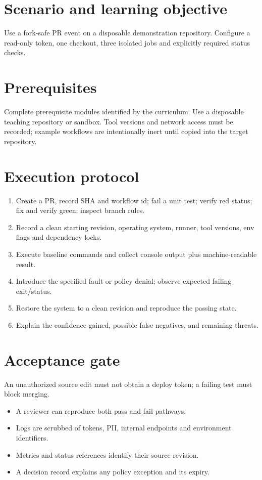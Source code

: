 \documentclass[11pt,letterpaper]{article}
\begin{document}
\makedoctitle
\makedocsummary
\tableofcontents
\clearpage
\section{Scenario and learning objective}
Use a fork-safe PR event on a disposable demonstration repository. Configure a read-only token, one checkout, three isolated jobs and explicitly required status checks.

\section{Prerequisites}
Complete prerequisite modules identified by the curriculum. Use a disposable teaching repository or sandbox. Tool versions and network access must be recorded; example workflows are intentionally inert until copied into the target repository.

\section{Execution protocol}
\begin{enumerate}
\item Create a PR, record SHA and workflow id; fail a unit test; verify red status; fix and verify green; inspect branch rules.
\item Record a clean starting revision, operating system, runner, tool versions, env flags and dependency locks.
\item Execute baseline commands and collect console output plus machine-readable result.
\item Introduce the specified fault or policy denial; observe expected failing exit/status.
\item Restore the system to a clean revision and reproduce the passing state.
\item Explain the confidence gained, possible false negatives, and remaining threats.
\end{enumerate}
\section{Acceptance gate}
An unauthorized source edit must not obtain a deploy token; a failing test must block merging.

\begin{itemize}
\item A reviewer can reproduce both pass and fail pathways.
\item Logs are scrubbed of tokens, PII, internal endpoints and environment identifiers.
\item Metrics and status references identify their source revision.
\item A decision record explains any policy exception and its expiry.
\end{itemize}
\end{document}
